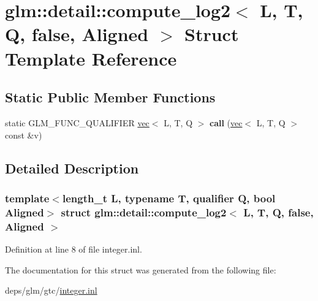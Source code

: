 \hypertarget{structglm_1_1detail_1_1compute__log2_3_01L_00_01T_00_01Q_00_01false_00_01Aligned_01_4}{}\section{glm\+:\+:detail\+:\+:compute\+\_\+log2$<$ L, T, Q, false, Aligned $>$ Struct Template Reference}
\label{structglm_1_1detail_1_1compute__log2_3_01L_00_01T_00_01Q_00_01false_00_01Aligned_01_4}
\subsection*{Static Public Member Functions}
\begin{DoxyCompactItemize}
\item 
\mbox{\label{structglm_1_1detail_1_1compute__log2_3_01L_00_01T_00_01Q_00_01false_00_01Aligned_01_4_ac62f752297dfcc4f1778e504cce4e305}} 
static G\+L\+M\+\_\+\+F\+U\+N\+C\+\_\+\+Q\+U\+A\+L\+I\+F\+I\+ER \hyperlink{structglm_1_1vec}{vec}$<$ L, T, Q $>$ {\bfseries call} (\hyperlink{structglm_1_1vec}{vec}$<$ L, T, Q $>$ const \&v)
\end{DoxyCompactItemize}


\subsection{Detailed Description}
\subsubsection*{template$<$length\+\_\+t L, typename T, qualifier Q, bool Aligned$>$\newline
struct glm\+::detail\+::compute\+\_\+log2$<$ L, T, Q, false, Aligned $>$}



Definition at line 8 of file integer.\+inl.



The documentation for this struct was generated from the following file\+:\begin{DoxyCompactItemize}
\item 
deps/glm/gtc/\hyperlink{gtc_2integer_8inl}{integer.\+inl}\end{DoxyCompactItemize}
